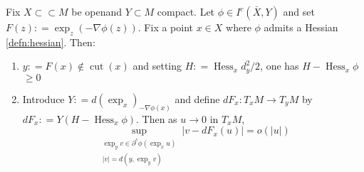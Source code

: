\begin{prop} 
	\label{prop:differentiate_optimal_transport}
	Fix \( X \subset \subset M \) be openand \( Y \subset M \) compact. Let \( \phi \in I ^ { c } ( \bar { X } , Y ) \) and set \( F ( z ) : = \exp _ { z } ( - \nabla \phi ( z ) ) . \)
	Fix a point \( x \in X \) where \( \phi \) admits a Hessian \cref{defn:hessian}.
	Then:
	\begin{enumerate}
		\item \( y : = F ( x ) \notin \operatorname { cut } ( x ) \) and setting \( H : = \operatorname { Hess } _ { x } d _ { y } ^ { 2 } / 2 \), one has \( H - \operatorname { Hess } _ { x } \phi \) \( \geq 0 \)
		\item Introduce \( Y : = d \left( \exp _ { x } \right) _ { - \nabla \phi ( x ) } \) and define \( d F _ { x } : T _ { x } M \longrightarrow T _ { y } M \) by
\( d F _ { x } : = Y \left( H - \operatorname { Hess } _ { x } \phi \right) \). Then as \( u \rightarrow 0 \) in \( T _ { x } M \),
\begin{equation} 
	\sup _ {\substack {\exp _ { y } v \in \partial ^ { c } \phi \left( \exp _ { x } u \right) \\ | v | = d \left( y , \exp _ { y } v \right)} } \left| v - d F _ { x } ( u ) \right| = o ( | u | ) 
\end{equation}

	\end{enumerate}
\end{prop}

